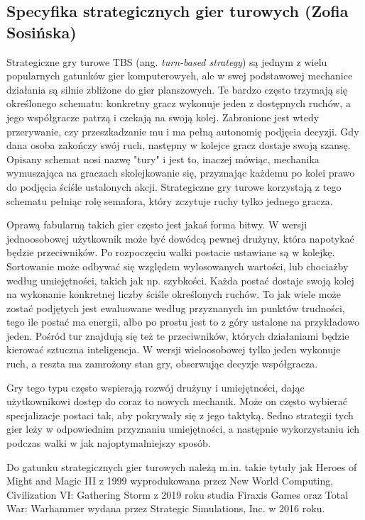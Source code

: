 \subsection{Specyfika strategicznych gier turowych (Zofia Sosińska)}\label{ss:tbs}
Strategiczne gry turowe TBS (ang. \textit{turn-based strategy}) są jednym z wielu popularnych gatunków gier komputerowych, ale w swej podstawowej mechanice działania są silnie zbliżone do
gier planszowych. Te bardzo często trzymają się określonego schematu: konkretny gracz wykonuje jeden z dostępnych ruchów, a jego współgracze patrzą i czekają 
na swoją kolej. Zabronione jest wtedy przerywanie, czy przeszkadzanie mu i ma pełną autonomię podjęcia decyzji. Gdy dana osoba zakończy swój ruch, następny w kolejce gracz
dostaje swoją szansę. Opisany schemat nosi nazwę "tury" i jest to, inaczej mówiąc, mechanika wymuszająca na graczach skolejkowanie się, przyznając każdemu po kolei
prawo do podjęcia ściśle ustalonych akcji. Strategiczne gry turowe korzystają z tego schematu pełniąc rolę semafora, który zczytuje ruchy tylko jednego gracza.

Oprawą fabularną takich gier często jest jakaś forma bitwy. W wersji jednoosobowej użytkownik może być dowódcą pewnej drużyny, która napotykać będzie przeciwników. Po 
rozpoczęciu walki postacie ustawiane są w kolejkę. Sortowanie może odbywać się względem wylosowanych wartości, lub chociażby według umiejętności, takich jak np. szybkości. Każda postać
 dostaje swoją kolej na wykonanie konkretnej liczby ściśle określonych ruchów. To jak wiele może zostać podjętych jest ewaluowane według przyznanych im punktów 
 trudności, tego ile postać ma energii, albo po prostu jest to z góry ustalone na przykładowo jeden. Pośród tur znajdują się też te przeciwników, których działaniami będzie 
 kierować sztuczna inteligencja. W wersji wieloosobowej tylko jeden wykonuje ruch, a reszta ma zamrożony stan gry, obserwując decyzje współgracza.

Gry tego typu często wspierają rozwój drużyny i umiejętności, dając użytkownikowi dostęp do coraz to nowych mechanik. Może on często wybierać specjalizacje postaci tak, aby 
pokrywały się z jego taktyką. Sedno strategii tych gier leży w odpowiednim przyznaniu umiejętności, a następnie wykorzystaniu ich podczas walki w jak najoptymalniejszy sposób.

Do gatunku strategicznych gier turowych należą m.in. takie tytuły jak Heroes of Might and Magic III z 1999 wyprodukowana przez New World Computing, 
Civilization VI: Gathering Storm z 2019 roku studia Firaxis Games oraz Total War: Warhammer wydana przez Strategic Simulations, Inc. w 2016 roku.
